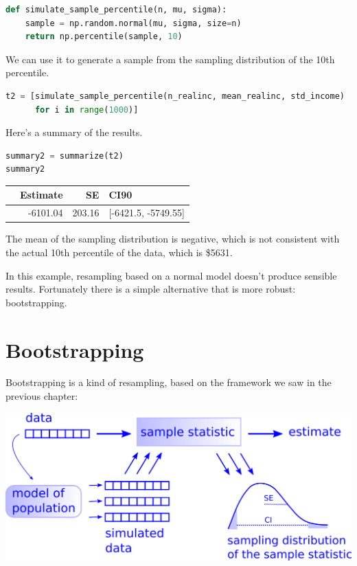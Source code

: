 \begin{lstlisting}[language=Python]
def simulate_sample_percentile(n, mu, sigma):
    sample = np.random.normal(mu, sigma, size=n)
    return np.percentile(sample, 10)
\end{lstlisting}

We can use it to generate a sample from the sampling distribution of the
10th percentile.

\begin{lstlisting}[language=Python]
t2 = [simulate_sample_percentile(n_realinc, mean_realinc, std_income)
      for i in range(1000)]
\end{lstlisting}

Here's a summary of the results.

\begin{lstlisting}[language=Python]
summary2 = summarize(t2)
summary2
\end{lstlisting}

\begin{tabular}{lrrl}
\toprule
{} &  Estimate &      SE &                 CI90 \\
\midrule
{} &  -6101.04 &  203.16 &  [-6421.5, -5749.55] \\
\bottomrule
\end{tabular}

The mean of the sampling distribution is negative, which is not
consistent with the actual 10th percentile of the data, which is \$5631.

In this example, resampling based on a normal model doesn't produce
sensible results. Fortunately there is a simple alternative that is more
robust: bootstrapping.

\hypertarget{bootstrapping}{%
\section{Bootstrapping}\label{bootstrapping}}

Bootstrapping is a kind of resampling, based on the framework we saw in
the previous chapter:

\includegraphics{figs/resampling.png}


